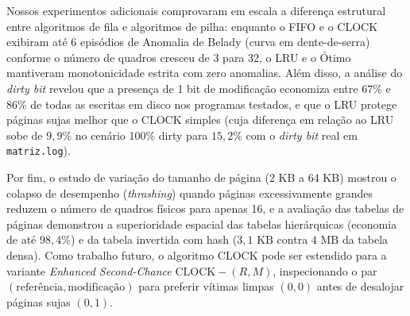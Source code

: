 \documentclass[12pt,a4paper]{article}
\begin{document}
Nossos experimentos adicionais comprovaram em escala a diferença estrutural entre algoritmos de fila e algoritmos de pilha: enquanto o FIFO e o CLOCK exibiram até 6 episódios de Anomalia de Belady (curva em dente-de-serra) conforme o número de quadros cresceu de 3 para 32, o LRU e o Ótimo mantiveram monotonicidade estrita com zero anomalias. Além disso, a análise do \textit{dirty bit} revelou que a presença de 1 bit de modificação economiza entre $67\%$ e $86\%$ de todas as escritas em disco nos programas testados, e que o LRU protege páginas sujas melhor que o CLOCK simples (cuja diferença em relação ao LRU sobe de $9,9\%$ no cenário 100\% dirty para $15,2\%$ com o \textit{dirty bit} real em \texttt{matriz.log}).

Por fim, o estudo de variação do tamanho de página (2 KB a 64 KB) mostrou o colapso de desempenho (\textit{thrashing}) quando páginas excessivamente grandes reduzem o número de quadros físicos para apenas 16, e a avaliação das tabelas de páginas demonstrou a superioridade espacial das tabelas hierárquicas (economia de até $98,4\%$) e da tabela invertida com hash ($3,1\text{ KB}$ contra $4\text{ MB}$ da tabela densa). Como trabalho futuro, o algoritmo CLOCK pode ser estendido para a variante \textit{Enhanced Second-Chance} $\text{CLOCK}-(R,M)$, inspecionando o par $(\text{referência}, \text{modificação})$ para preferir vítimas limpas $(0,0)$ antes de desalojar páginas sujas $(0,1)$.
\end{document}
